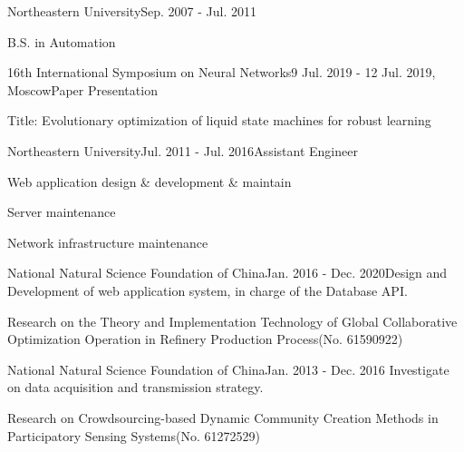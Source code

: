 \documentclass{joel_cv}
\begin{document}
\begin{sectionContentSimple}{Northeastern University}{Sep. 2007 - Jul. 2011}
	\item B.S. in Automation
\end{sectionContentSimple}


%
%


\begin{sectionContentNormal}{16th International Symposium on Neural Networks}{9 Jul. 2019 - 12 Jul. 2019, Moscow}{Paper Presentation}
	\item Title: Evolutionary optimization of liquid state machines for robust learning
\end{sectionContentNormal}



\begin{sectionContentNormal}{Northeastern University}{Jul. 2011 - Jul. 2016}{Assistant Engineer}
	\item Web application design \& development \& maintain
	\item Server maintenance
	\item Network infrastructure maintenance
\end{sectionContentNormal}



%
%



\begin{sectionContentNormal}{National Natural Science Foundation of China}{Jan. 2016 - Dec. 2020}{Design and Development of web application system, in charge of the Database API.}
	\item Research on the Theory and Implementation Technology of Global Collaborative Optimization Operation in Refinery Production Process(No. 61590922)
\end{sectionContentNormal}

\begin{sectionContentNormal}{National Natural Science Foundation of China}{Jan. 2013 - Dec. 2016}{ Investigate on data acquisition and transmission strategy.}
	\item Research on Crowdsourcing-based Dynamic Community Creation Methods in Participatory Sensing Systems(No. 61272529)
\end{sectionContentNormal}
\end{document}

